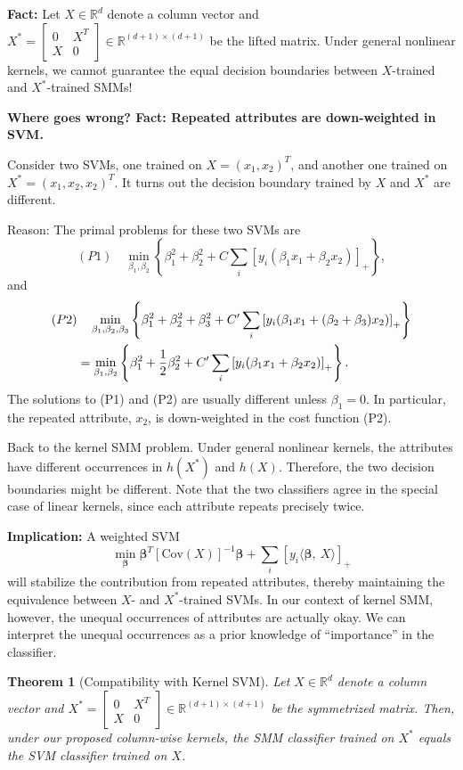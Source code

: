 \documentclass[11pt]{article}
\theoremstyle{plain}
\newtheorem{thm}{Theorem}[section]
\theoremstyle{definition}
\begin{document}
{\bf Fact:} Let $X\in\mathbb{R}^{d}$ denote a column vector and $X^*=\begin{bmatrix}
0&X^T\\
X& 0
\end{bmatrix}\in\mathbb{R}^{(d+1)\times (d+1)}$ be the lifted matrix. 
Under general nonlinear kernels, we cannot guarantee the equal decision boundaries between $X$-trained and $X^*$-trained SMMs! 

{\bf Where goes wrong? Fact: Repeated attributes are down-weighted in SVM.} 

Consider two SVMs, one trained on $X=(x_1,x_2)^T$, and another one trained on $X^*=(x_1,x_2,x_2)^T$. It turns out the decision boundary trained by $X$ and $X^*$ are different.

Reason: The primal problems for these two SVMs are
\[
(P1)\quad \min_{\beta_1,\beta_2} \left\{\beta^2_1+\beta^2_2+C\sum_i\left[ y_i(\beta_1x_1+\beta_2x_2)\right]_{+}\right\},
\]
and
\begin{align}
(P2)&\quad \min_{\beta_1,\beta_2, \beta_3}\left\{\beta^2_1+\beta^2_2+\beta_3^2+C'\sum_i\left[ y_i(\beta_1x_1+(\beta_2+\beta_3)x_2)\right]_{+}\right\}\\
&=\min_{\beta_1,\beta_2} \left\{\beta_1^2+{1\over 2}\beta^2_2+C'\sum_i\left[y_i(\beta_1x_1+\beta_2x_2)\right]_{+} \right\}.
\end{align}
The solutions to (P1) and (P2) are usually different unless $\beta_1=0$. In particular, the repeated attribute, $x_2$, is down-weighted in the cost function (P2). 

Back to the kernel SMM problem. Under general nonlinear kernels, the attributes have different occurrences in $h(X^*)$ and $h(X)$. Therefore, the two decision boundaries might be different. Note that the two classifiers agree in the special case of linear kernels, since each attribute repeats precisely twice.


{\bf Implication:} A weighted SVM
\[
\min_{\boldsymbol{\beta}}\boldsymbol{\beta}^T[\text{Cov}(X)]^{-1}\boldsymbol{\beta}+\sum_i\left[y_i\langle \boldsymbol{\beta},\ X\rangle\right]_{+}
\]
will stabilize the contribution from repeated attributes, thereby maintaining the equivalence between $X$- and $X^*$-trained SVMs. In our context of kernel SMM, however, the unequal occurrences of attributes are actually okay. We can interpret the unequal occurrences as a prior knowledge of ``importance'' in the classifier. 


\begin{thm}[Compatibility with Kernel SVM] Let $X\in\mathbb{R}^{d}$ denote a column vector and $X^*=\begin{bmatrix}
0&X^T\\
X& 0
\end{bmatrix}\in\mathbb{R}^{(d+1)\times (d+1)}$ be the symmetrized matrix. Then, under our proposed column-wise kernels, the SMM classifier trained on $X^*$ equals the SVM classifier trained on $X$. 
\end{thm}
\end{document}
